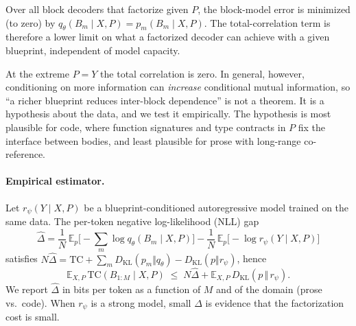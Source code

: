 \begin{corollary}
\label{cor:irreducible}
Over all block decoders that factorize given $P$, the block-model error is
minimized (to zero) by $q_\theta(B_m\mid X,P)=p_m(B_m\mid X,P)$. The
total-correlation term is therefore a lower limit on what a factorized decoder
can achieve with a given blueprint, independent of model capacity.
\end{corollary}

\begin{remark}
At the extreme $P=Y$ the total correlation is zero. In general, however,
conditioning on more information can \emph{increase} conditional mutual
information, so ``a richer blueprint reduces inter-block dependence'' is not a
theorem. It is a hypothesis about the data, and we test it empirically. The
hypothesis is most plausible for code, where function signatures and type
contracts in $P$ fix the interface between bodies, and least plausible for
prose with long-range co-reference.
\end{remark}

\paragraph{Empirical estimator.} Let $r_\psi(Y\mid X,P)$ be a
blueprint-conditioned autoregressive model trained on the same data. The
per-token negative log-likelihood (NLL) gap
\begin{equation}
  \widehat{\Delta}
  =\frac1N\,\mathbb{E}_p\Big[-\sum_m\log q_\theta(B_m\mid X,P)\Big]
  -\frac1N\,\mathbb{E}_p\big[-\log r_\psi(Y\mid X,P)\big]
\end{equation}
satisfies
$N\widehat{\Delta}=\mathrm{TC}+\sum_m D_{\mathrm{KL}}(p_m\Vert q_\theta)
 -D_{\mathrm{KL}}(p\Vert r_\psi)$, hence
\begin{equation}
  \mathbb{E}_{X,P}\,\mathrm{TC}(B_{1:M}\mid X,P)
  \;\le\;N\widehat{\Delta}+\mathbb{E}_{X,P}\,D_{\mathrm{KL}}(p\,\Vert\,r_\psi).
\end{equation}
We report $\widehat{\Delta}$ in bits per token as a function of $M$ and of the
domain (prose vs.\ code). When $r_\psi$ is a strong model, small
$\widehat{\Delta}$ is evidence that the factorization cost is small.
